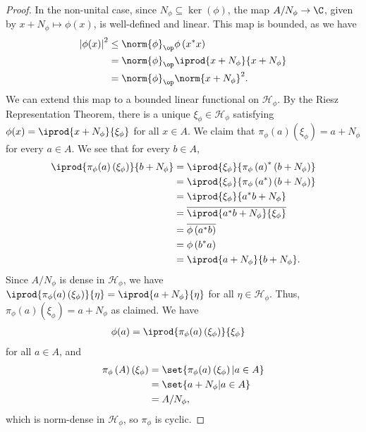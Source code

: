 \documentclass[10pt]{mypackage}
\begin{document}
\begin{proof}
  In the non-unital case, since $N_{\phi}\subseteq \ker\left(\phi\right)$, the map $A/N_{\phi}\rightarrow \C$, given by $x + N_{\phi}\mapsto \phi(x)$, is well-defined and linear. This map is bounded, as we have
  \begin{align*}
    \left\vert \phi(x) \right\vert^2 &\leq \norm{\phi}_{\op}\phi\left(x^{\ast}x\right)\\
                                     &= \norm{\phi}_{\op} \iprod{x + N_{\phi}}{x + N_{\phi}}\\
                                     &= \norm{\phi}_{\op}\norm{x + N_{\phi}}^2.
  \end{align*}
  We can extend this map to a bounded linear functional on $\mathcal{H}_{\phi}$. By the Riesz Representation Theorem, there is a unique $\xi_{\phi}\in \mathcal{H}_{\phi}$ satisfying $\phi(x) = \iprod{x + N_{\phi}}{\xi_{\phi}}$ for all $x\in A$. We claim that $\pi_{\phi}(a)\left(\xi_{\phi}\right) = a + N_{\phi}$ for every $a\in A$. We see that for every $b\in A$,
  \begin{align*}
    \iprod{\pi_{\phi}(a)\left(\xi_{\phi}\right)}{b + N_{\phi}} &= \iprod{\xi_{\phi}}{\pi_{\phi}\left(a\right)^{\ast}\left(b + N_{\phi}\right)}\\
                                                               &= \iprod{\xi_{\phi}}{\pi_{\phi}\left(a^{\ast}\right)\left(b + N_{\phi}\right)}\\
                                                               &= \iprod{\xi_{\phi}}{a^{\ast}b + N_{\phi}}\\
                                                               &= \overline{ \iprod{a^{\ast}b + N_{\phi}}{\xi_{\phi}} }\\
                                                               &= \overline{\phi\left(a^{\ast}b\right)}\\
                                                               &= \phi\left(b^{\ast}a\right)\\
                                                               &= \iprod{a + N_{\phi}}{ b + N_{\phi} }.
  \end{align*}
  Since $A/N_{\phi}$ is dense in $\mathcal{H}_{\phi}$, we have $ \iprod{\pi_{\phi}(a)\left(\xi_{\phi}\right)}{\eta} = \iprod{a + N_{\phi}}{\eta} $ for all $\eta\in \mathcal{H}_{\phi}$. Thus, $\pi_{\phi}(a)\left(\xi_{\phi}\right) = a + N_{\phi}$ as claimed. We have
  \begin{align*}
    \phi(a) &= \iprod{\pi_{\phi}(a)\left(\xi_{\phi}\right)}{\xi_{\phi}}
  \end{align*}
  for all $a\in A$, and
  \begin{align*}
    \pi_{\phi}\left(A\right)\left(\xi_{\phi}\right) &= \set{\pi_{\phi}(a)\left(\xi_{\phi}\right) | a\in A}\\
                                                    &= \set{a + N_{\phi} | a\in A}\\
                                                    &= A/N_{\phi},
  \end{align*}
  which is norm-dense in $\mathcal{H}_{\phi}$, so $\pi_{\phi}$ is cyclic.\newline


\end{proof}
\end{document}
